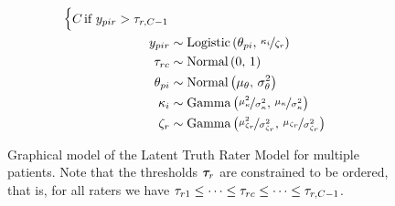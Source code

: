 \documentclass[a4paper,11pt]{article}
\begin{document}
\begin{figure}[!ht]
\begin{minipage}{0.45\textwidth}
{\begin{align*}
\begin{cases}
			\Tncat	&\hspace{-.3cm} \text{if } \oneAppraisal > \Threshold_{\Irater, \Tncat-1}
			\end{cases}\\
			\oneAppraisal &\sim \dlogis{\ItemTruth_{\Ipatient\Iitem}}{\nicefrac{\ItemDifficulty_\Iitem}{\RaterCompetence_\Irater}} \\
			\Threshold_{\Irater\Incat} &\sim \dnorm{0}{1}\\
			\ItemTruth_{\Ipatient\Iitem}        &\sim \dnorm{\mu_\ItemTruth}{\sigma_\ItemTruth^2}\\
			\ItemDifficulty_\Iitem   &\sim \dgammaMV{\mu_\ItemDifficulty}{\sigma_\ItemDifficulty^2} \\
			\RaterCompetence_\Irater &\sim \dgammaMV{\mu_{\RaterCompetence_\Irater}}{\sigma_{\RaterCompetence_\Irater}^2} \\
			\end{align*}
		}%
	\end{minipage}
	\caption{%
		Graphical model of the Latent Truth Rater Model for multiple patients.
		Note that the thresholds $\bm{\tau}_r$ are constrained to be ordered, that is, for all raters we have $\Threshold_{\Irater 1} \leq \dots \leq \Threshold_{\Irater \Incat} \leq \dots \leq \Threshold_{\Irater,\Tncat-1}$.
	}
	\label{model:LTM_p}
\end{figure}
\end{document}
